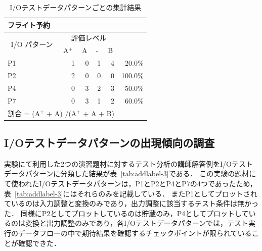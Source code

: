 \begin{table}[htbp]
  \centering
  \caption{I/Oテストデータパターンごとの集計結果}
    \begin{tabular}{lllllr}
    フライト予約 &       &       &       &       &  \bigstrut[b]\\
    \hline
    \multicolumn{1}{|c|}{\multirow{2}[4]{*}{I/O パターン}} & \multicolumn{4}{c|}{評価レベル}    & \multicolumn{1}{c|}{\multirow{2}[4]{*}{}} \bigstrut\\
\cline{2-5}    \multicolumn{1}{|c|}{} & \multicolumn{1}{l|}{A${}^\text{+}$} & \multicolumn{1}{l|}{A} & \multicolumn{1}{l|}{-} & \multicolumn{1}{l|}{B} & \multicolumn{1}{c|}{} \bigstrut\\
    \hline
    \multicolumn{1}{|l|}{P1} & \multicolumn{1}{r|}{1} & \multicolumn{1}{r|}{0} & \multicolumn{1}{r|}{1} & \multicolumn{1}{r|}{4} & \multicolumn{1}{r|}{20.0\%} \bigstrut\\
    \hline
    \multicolumn{1}{|l|}{P2} & \multicolumn{1}{r|}{2} & \multicolumn{1}{r|}{0} & \multicolumn{1}{r|}{0} & \multicolumn{1}{r|}{0} & \multicolumn{1}{r|}{100.0\%} \bigstrut\\
    \hline
    \multicolumn{1}{|l|}{P4} & \multicolumn{1}{r|}{0} & \multicolumn{1}{r|}{3} & \multicolumn{1}{r|}{2} & \multicolumn{1}{r|}{3} & \multicolumn{1}{r|}{50.0\%} \bigstrut\\
    \hline
    \multicolumn{1}{|l|}{P7} & \multicolumn{1}{r|}{0} & \multicolumn{1}{r|}{3} & \multicolumn{1}{r|}{1} & \multicolumn{1}{r|}{2} & \multicolumn{1}{r|}{60.0\%} \bigstrut\\
    \hline
    \multicolumn{5}{l}{割合 = (A${}^\text{+}$  +  A) /(A${}^\text{+}$  +  A + B) } &  \bigstrut[t]\\
    \end{tabular}%
\label{tbl:D-4-tbl20}%
\end{table}%

\subsection{I/Oテストデータパターンの出現傾向の調査}

実験にて利用した2つの演習題材に対するテスト分析の講師解答例をI/Oテストデータパターンに分類した結果が表~\ref{tab:addlabel-3}である．
この実験の題材にて使われたI/Oテストデータパターンは，P1とP2とP4とP7の4つであったため，表~\ref{tab:addlabel-3}にはそれらのみを記載している．
またP1としてプロットされているのは入力調整と変換のみであり，出力調整に該当するテスト条件は無かった．
同様にP2としてプロットしているのは貯蔵のみ，P4としてプロットしているのは変換と出力調整のみであり，各I/Oテストデータパターンでは，テスト実行のデータフローの中で期待結果を確認するチェックポイントが限られていることが確認できた．

